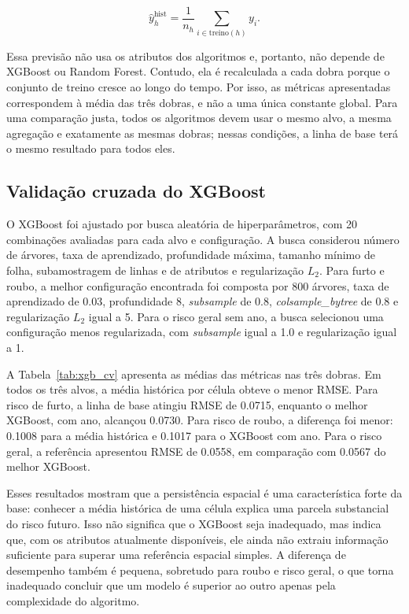 \documentclass[12pt]{article}
\begin{document}
\begin{equation}
\hat{y}_{h}^{\mathrm{hist}} = \frac{1}{n_h}\sum_{i \in \mathrm{treino}(h)} y_i.
\end{equation}

Essa previsão não usa os atributos dos algoritmos e, portanto, não depende de XGBoost ou Random Forest. Contudo, ela é recalculada a cada dobra porque o conjunto de treino cresce ao longo do tempo. Por isso, as métricas apresentadas correspondem à média das três dobras, e não a uma única constante global. Para uma comparação justa, todos os algoritmos devem usar o mesmo alvo, a mesma agregação e exatamente as mesmas dobras; nessas condições, a linha de base terá o mesmo resultado para todos eles.

\subsection{Validação cruzada do XGBoost}

O XGBoost foi ajustado por busca aleatória de hiperparâmetros, com 20 combinações avaliadas para cada alvo e configuração. A busca considerou número de árvores, taxa de aprendizado, profundidade máxima, tamanho mínimo de folha, subamostragem de linhas e de atributos e regularização $L_2$. Para furto e roubo, a melhor configuração encontrada foi composta por 800 árvores, taxa de aprendizado de 0.03, profundidade 8, \textit{subsample} de 0.8, \textit{colsample\_bytree} de 0.8 e regularização $L_2$ igual a 5. Para o risco geral sem ano, a busca selecionou uma configuração menos regularizada, com \textit{subsample} igual a 1.0 e regularização igual a 1.

A Tabela~\ref{tab:xgb_cv} apresenta as médias das métricas nas três dobras. Em todos os três alvos, a média histórica por célula obteve o menor RMSE. Para risco de furto, a linha de base atingiu RMSE de 0.0715, enquanto o melhor XGBoost, com ano, alcançou 0.0730. Para risco de roubo, a diferença foi menor: 0.1008 para a média histórica e 0.1017 para o XGBoost com ano. Para o risco geral, a referência apresentou RMSE de 0.0558, em comparação com 0.0567 do melhor XGBoost.

Esses resultados mostram que a persistência espacial é uma característica forte da base: conhecer a média histórica de uma célula explica uma parcela substancial do risco futuro. Isso não significa que o XGBoost seja inadequado, mas indica que, com os atributos atualmente disponíveis, ele ainda não extraiu informação suficiente para superar uma referência espacial simples. A diferença de desempenho também é pequena, sobretudo para roubo e risco geral, o que torna inadequado concluir que um modelo é superior ao outro apenas pela complexidade do algoritmo.
\end{document}
